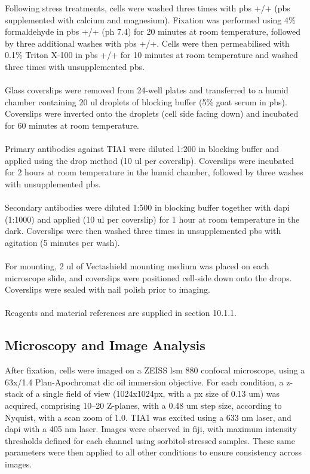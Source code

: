 Following stress treatments, cells were washed three times with \gls{pbs} +/+ (\gls{pbs} supplemented with calcium and magnesium). Fixation was performed using 4\% formaldehyde in \gls{pbs} +/+ (\gls{ph} 7.4) for 20 minutes at room temperature, followed by three additional washes with \gls{pbs} +/+. Cells were then permeabilised with 0.1\% Triton X-100 in \gls{pbs} +/+ for 10 minutes at room temperature and washed three times with unsupplemented \gls{pbs}.
\\
\\
Glass coverslips were removed from 24-well plates and transferred to a humid chamber containing 20 \gls{ul} droplets of blocking buffer (5\% goat serum in \gls{pbs}). Coverslips were inverted onto the droplets (cell side facing down) and incubated for 60 minutes at room temperature.
\\
\\
Primary antibodies against TIA1 were diluted 1:200 in blocking buffer and applied using the drop method (10 \gls{ul} per coverslip). Coverslips were incubated for 2 hours at room temperature in the humid chamber, followed by three washes with unsupplemented \gls{pbs}.
\\
\\
Secondary antibodies were diluted 1:500 in blocking buffer together with \gls{dapi} (1:1000) and applied (10 \gls{ul} per coverslip) for 1 hour at room temperature in the dark. Coverslips were then washed three times in unsupplemented \gls{pbs} with agitation (5 minutes per wash).
\\
\\
For mounting, 2 \gls{ul} of Vectashield mounting medium was placed on each microscope slide, and coverslips were positioned cell-side down onto the drops. Coverslips were sealed with nail polish prior to imaging.
\\
\\
Reagents and material references are supplied in section 10.1.1.

\subsection{Microscopy and Image Analysis}

After fixation, cells were imaged on a ZEISS \gls{lsm} 880 confocal microscope, using a 63x/1.4 Plan-Apochromat \gls{dic} oil immersion objective. For each condition, a z-stack of a single field of view (1024x1024\gls{px}, with a \gls{px} size of 0.13 \gls{um}) was acquired, comprising 10–20 Z-planes, with a 0.48 \gls{um} step size, according to Nyquist, with a scan zoom of 1.0. TIA1 was excited using a 633 \gls{nm} laser, and \gls{dapi} with a 405 \gls{nm} laser. Images were observed in \gls{fiji}, with maximum intensity thresholds defined for each channel using sorbitol-stressed samples. These same parameters were then applied to all other conditions to ensure consistency across images. 

